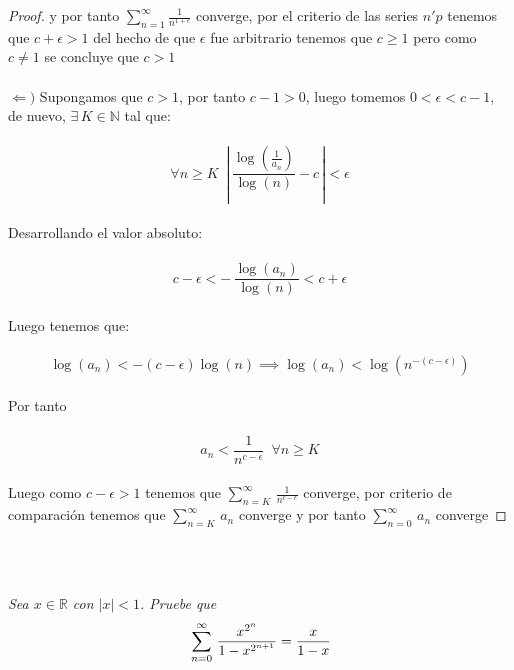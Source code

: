 \documentclass[11pt,letterpaper]{article}
\newcommand{\R}{\mathbb{R}}
\newcommand{\N}{\mathbb{N}}
\begin{document}
\begin{proof}
    y por tanto $\sum_{n=1}^{\infty}\frac{1}{n^{1+\epsilon}}$ converge, por el criterio de las series $n'p$ tenemos que
    $c+\epsilon>1$ del hecho de que $\epsilon$ fue arbitrario tenemos que $c\geq1$ pero como $c\neq 1$ se concluye que $c>1$\,\\
    \,\\
    \newpage
    $\Leftarrow)$\,\,Supongamos que $c>1$, por tanto $c-1>0$, luego tomemos $0<\epsilon<c-1$, de nuevo, 
    $\exists\,K\in \N$ tal que:\,\\
    \,\\
    \begin{equation*}
    \forall n\geq K\,\,\,\left|\,\frac{\log\left(\frac{1}{a_n}\right)}{\log(n)}-c\,\right|<\epsilon
    \end{equation*}\,\\
    Desarrollando el valor absoluto:\,\\
    \,\\
    \begin{equation*}
        c-\epsilon<-\,\frac{\log(a_n)}{\log(n)}<c+\epsilon
    \end{equation*}\,\\
    Luego tenemos que:\,\\
    \,\\
    \begin{equation*}
        \log(a_n)<-(c-\epsilon)\log(n)\implies \log(a_n)<\log(n^{-(c-\epsilon)})
    \end{equation*}\,\\
    Por tanto\,\\
    \,\\
    \begin{equation*}
        a_n<\frac{1}{n^{c-\epsilon}}\,\,\,\forall n\geq K
    \end{equation*}\,\\
    Luego como $c-\epsilon>1$ tenemos que $\sum_{n=K}^{\infty}\,\frac{1}{n^{c-\epsilon}}$ converge, por criterio de 
    comparaci\'on tenemos que $\sum_{n=K}^{\infty}\,a_n$ converge y por tanto $\sum_{n=0}^{\infty}\,a_n$ converge
\end{proof}\,\\
\,\\
\begin{tcolorbox}[
	title = \textcolor{black}{\textcolor{white}{Problema}},]
\textit{Sea $x\in \R$ con $|x|<1$. Pruebe que 
\begin{equation*}
\displaystyle\,\sum_{n=0}^{\infty}\,\frac{x^{2^n}}{1-x^{2^{n+1}}}=\frac{x}{1-x}
\,\\
\end{equation*}
}
\end{tcolorbox}\,\\
\end{document}
